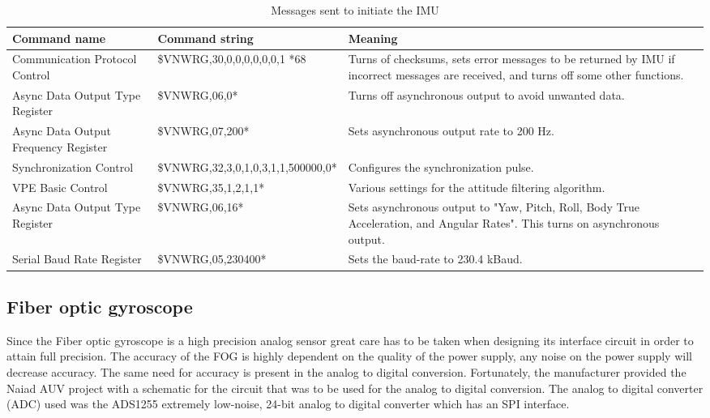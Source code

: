 \begin{table*}
\centering
    \caption{Messages sent to initiate the IMU}
    \begin{tabular}{|p{2.5cm}|l|p{6cm}|} \hline
    \label{table:IMU_messages}
    	\textbf{Command name} & \textbf{Command string} & \textbf{Meaning} \\ \hline
        Communication Protocol Control & \$VNWRG,30,0,0,0,0,0,0,1 *68 & Turns of checksums, sets error messages to be returned by IMU if incorrect messages are received, and turns off some other functions. \\ \hline
        Async Data Output Type Register & \$VNWRG,06,0* & Turns off asynchronous output to avoid unwanted data. \\ \hline
        Async Data Output Frequency Register & \$VNWRG,07,200* & Sets asynchronous output rate to 200 Hz. \\ \hline        
        Synchronization Control & \$VNWRG,32,3,0,1,0,3,1,1,500000,0* & Configures the synchronization pulse. \\ \hline
        VPE Basic Control & \$VNWRG,35,1,2,1,1* & Various settings for the attitude filtering algorithm. \\ \hline
        Async Data Output Type Register & \$VNWRG,06,16* & Sets asynchronous output to "Yaw, Pitch, Roll, Body True Acceleration, and Angular Rates". This turns on asynchronous output. \\ \hline
        Serial Baud Rate Register & \$VNWRG,05,230400* & Sets the baud-rate to 230.4 kBaud. \\ \hline        
    \end{tabular}
\end{table*}




\subsection{Fiber optic gyroscope}
Since the Fiber optic gyroscope is a high precision analog sensor great care has to be taken when designing its interface circuit in order to attain full precision. \newline
The accuracy of the FOG is highly dependent on the quality of the power supply, any noise on the power supply will decrease accuracy. The same need for accuracy is present in the analog to digital conversion. Fortunately, the manufacturer provided the Naiad AUV project with a schematic for the circuit that was to be used for the analog to digital conversion. The analog to digital converter (ADC) used was the ADS1255 extremely low-noise, 24-bit analog to digital converter which has an SPI interface.

